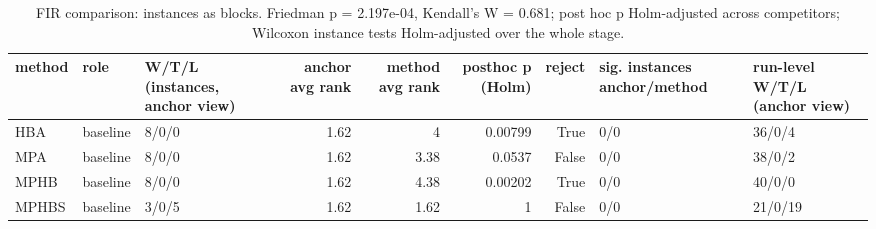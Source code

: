 \begin{table}[t]
\centering
\scriptsize
\caption{FIR comparison: instances as blocks. Friedman p = 2.197e-04, Kendall's W = 0.681; post hoc p Holm-adjusted across competitors; Wilcoxon instance tests Holm-adjusted over the whole stage.}
\label{tab:fir_comparison_global}
\begin{tabular}{lllrrrrll}
\toprule
method & role & W/T/L (instances, anchor view) & anchor avg rank & method avg rank & posthoc p (Holm) & reject & sig. instances anchor/method & run-level W/T/L (anchor view) \\
\midrule
HBA & baseline & 8/0/0 & 1.62 & 4 & 0.00799 & True & 0/0 & 36/0/4 \\
MPA & baseline & 8/0/0 & 1.62 & 3.38 & 0.0537 & False & 0/0 & 38/0/2 \\
MPHB & baseline & 8/0/0 & 1.62 & 4.38 & 0.00202 & True & 0/0 & 40/0/0 \\
MPHBS & baseline & 3/0/5 & 1.62 & 1.62 & 1 & False & 0/0 & 21/0/19 \\
\bottomrule
\end{tabular}
\end{table}

